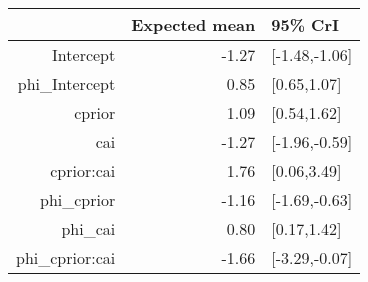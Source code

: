 \begin{tabular}{rrl}
  \hline
 & Expected mean & 95\% CrI \\ 
  \hline
Intercept & -1.27 & [-1.48,-1.06] \\ 
  phi\_Intercept & 0.85 & [0.65,1.07] \\ 
  cprior & 1.09 & [0.54,1.62] \\ 
  cai & -1.27 & [-1.96,-0.59] \\ 
  cprior:cai & 1.76 & [0.06,3.49] \\ 
  phi\_cprior & -1.16 & [-1.69,-0.63] \\ 
  phi\_cai & 0.80 & [0.17,1.42] \\ 
  phi\_cprior:cai & -1.66 & [-3.29,-0.07] \\ 
   \hline
\end{tabular}

